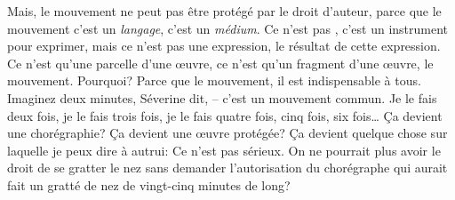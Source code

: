 {Mais, le mouvement ne peut pas \^etre prot\'eg\'e par le droit
d'auteur, parce que le mouvement c'est un {\em langage}, c'est un
{\em m\'edium}. Ce n'est pas , c'est un instrument
pour exprimer, mais ce n'est pas une expression, le r\'esultat de cette
expression. Ce n'est qu'une parcelle d'une {\oe}uvre, ce n'est qu'un
fragment d'une {\oe}uvre, le mouvement. Pourquoi? Parce que le
mouvement, il est indispensable \`a tous. Imaginez deux minutes,
S\'everine dit,  {--} c'est un mouvement commun.
Je le fais deux fois, je le fais trois fois, je le fais quatre fois,
cinq fois, six fois{\dots} \c{C}a devient une chor\'egraphie? \c{C}a
devient une {\oe}uvre prot\'eg\'ee? \c{C}a devient quelque chose sur
laquelle je peux dire \`a autrui:  Ce n'est pas s\'erieux.
On ne pourrait plus avoir le droit de se gratter le nez sans demander
l'autorisation du chor\'egraphe qui aurait fait un gratt\'e de nez de
vingt{}-cinq minutes de long?\par

}
